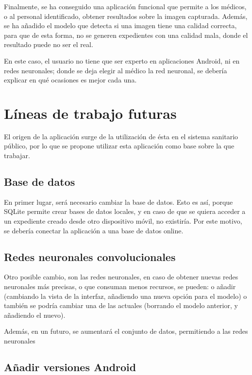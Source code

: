 Finalmente, se ha conseguido una aplicación funcional que permite a los médicos, o al personal identificado, obtener resultados sobre la imagen capturada. Además, se ha añadido el modelo que detecta si una imagen tiene una calidad correcta, para que de esta forma, no se generen expedientes con una calidad mala, donde el resultado puede no ser el real. 

En este caso, el usuario no tiene que ser experto en aplicaciones Android, ni en redes neuronales; donde se deja elegir al médico la red neuronal, se debería explicar en qué ocasiones es mejor cada una.

\section{Líneas de trabajo futuras}

El origen de la aplicación surge de la utilización de ésta en el sistema sanitario público, por lo que se propone utilizar esta aplicación como base sobre la que trabajar. 

\subsection{Base de datos}

En primer lugar, será necesario cambiar la base de datos. Esto es así, porque SQLite permite crear bases de datos locales, y en caso de que se quiera acceder a un expediente creado desde otro dispositivo móvil, no existiría. Por este motivo, se debería conectar la aplicación a una base de datos online.

\subsection{Redes neuronales convolucionales}

Otro posible cambio, son las redes neuronales, en caso de obtener nuevas redes neuronales más precisas, o que consuman menos recursos, se pueden: o añadir (cambiando la vista de la interfaz, añadiendo una nueva opción para el modelo)  o también se podría cambiar una de las actuales (borrando el modelo anterior, y añadiendo el nuevo).

Además, en un futuro, se aumentará el conjunto de datos, permitiendo a las redes neuronales 

\subsection{Añadir versiones Android}

